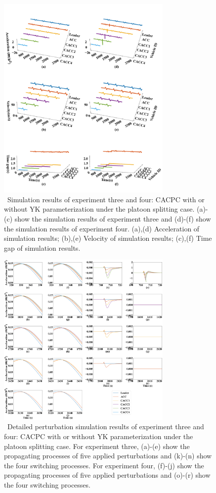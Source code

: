 \documentclass[journal]{IEEEtran}
\begin{document}
\begin{figure}
  \centering
  \includegraphics[width=8.5cm]{figs/c_split.png}
  \caption{~Simulation results of experiment three and four: CACPC with or without YK parameterization under the platoon splitting case. (a)-(c) show the simulation results of experiment three and (d)-(f) show the simulation results of experiment four. (a),(d) Acceleration of simulation results; (b),(e) Velocity of simulation results; (c),(f) Time gap of simulation results.}
  \label{new3}
\end{figure}

\begin{figure}
  \centering
  \includegraphics[width=8.5cm]{figs/split_detail.png}
  \caption{~Detailed perturbation simulation results of experiment three and four: CACPC with or without YK parameterization under the platoon splitting case. For experiment three, (a)-(e) show the propagating processes of five applied perturbations and (k)-(n) show the four switching processes. For experiment four, (f)-(j) show the propagating processes of five applied perturbations and (o)-(r) show the four switching processes.}
  \label{new4}
\end{figure}
\end{document}
